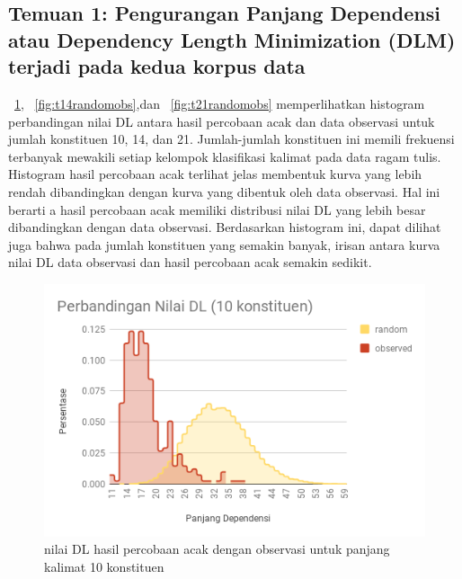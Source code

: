 \subsection{Temuan 1: Pengurangan Panjang Dependensi atau Dependency Length Minimization (DLM) terjadi pada kedua korpus data}
\pic~\ref{fig:t10randomobs}, \pic~\ref{fig:t14randomobs},dan \pic~\ref{fig:t21randomobs} memperlihatkan histogram perbandingan nilai DL antara hasil percobaan acak dan data observasi untuk jumlah konstituen 10, 14, dan 21. Jumlah-jumlah konstituen ini memili frekuensi terbanyak mewakili setiap kelompok klasifikasi kalimat pada data ragam tulis.  Histogram hasil percobaan acak terlihat jelas membentuk kurva yang lebih rendah dibandingkan dengan kurva yang dibentuk oleh data observasi. Hal ini berarti a hasil percobaan acak memiliki distribusi nilai DL yang lebih besar dibandingkan dengan data observasi. Berdasarkan histogram ini, dapat dilihat juga bahwa pada jumlah konstituen yang semakin banyak, irisan antara kurva nilai DL data observasi dan hasil percobaan acak semakin sedikit.

\begin{figure}
	\centering \includegraphics[width=1
	\textwidth] {pics/t10randomobs.png} 
	\caption{ nilai DL hasil percobaan acak dengan observasi untuk panjang kalimat 10 konstituen} 
\label{fig:t10randomobs} 
\end{figure}

